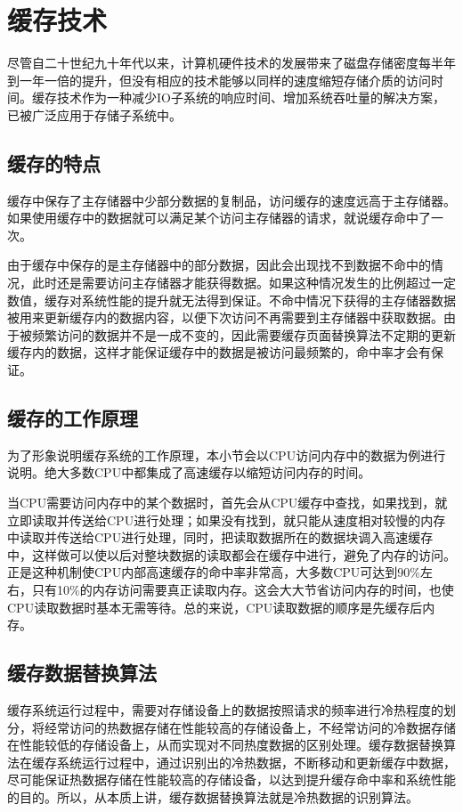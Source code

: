 \section{缓存技术}
\label{sec:cache_tech}

尽管自二十世纪九十年代以来，计算机硬件技术的发展带来了磁盘存储密度每半年到一年一倍的提升，但没有相应的技术能够以同样的速度缩短存储介质的访问时间。缓存技术\cite{cache2011}作为一种减少IO子系统的响应时间、增加系统吞吐量的解决方案，已被广泛应用于存储子系统中。

\subsection{缓存的特点}
缓存中保存了主存储器中少部分数据的复制品，访问缓存的速度远高于主存储器。如果使用缓存中的数据就可以满足某个访问主存储器的请求，就说缓存命中了一次。

由于缓存中保存的是主存储器中的部分数据，因此会出现找不到数据不命中的情况，此时还是需要访问主存储器才能获得数据。如果这种情况发生的比例超过一定数值，缓存对系统性能的提升就无法得到保证。不命中情况下获得的主存储器数据被用来更新缓存内的数据内容，以便下次访问不再需要到主存储器中获取数据。由于被频繁访问的数据并不是一成不变的，因此需要缓存页面替换算法不定期的更新缓存内的数据，这样才能保证缓存中的数据是被访问最频繁的，命中率才会有保证。

\subsection{缓存的工作原理}
为了形象说明缓存系统的工作原理，本小节会以CPU访问内存中的数据为例进行说明。绝大多数CPU中都集成了高速缓存以缩短访问内存的时间。

当CPU需要访问内存中的某个数据时，首先会从CPU缓存中查找，如果找到，就立即读取并传送给CPU进行处理；如果没有找到，就只能从速度相对较慢的内存中读取并传送给CPU进行处理，同时，把读取数据所在的数据块调入高速缓存中，这样做可以使以后对整块数据的读取都会在缓存中进行，避免了内存的访问。正是这种机制使CPU内部高速缓存的命中率非常高，大多数CPU可达到90\%左右，只有10\%的内存访问需要真正读取内存。这会大大节省访问内存的时间，也使CPU读取数据时基本无需等待。总的来说，CPU读取数据的顺序是先缓存后内存。

\subsection{缓存数据替换算法}
缓存系统运行过程中，需要对存储设备上的数据按照请求的频率进行冷热程度的划分，将经常访问的热数据存储在性能较高的存储设备上，不经常访问的冷数据存储在性能较低的存储设备上，从而实现对不同热度数据的区别处理。缓存数据替换算法在缓存系统运行过程中，通过识别出的冷热数据，不断移动和更新缓存中数据，尽可能保证热数据存储在性能较高的存储设备，以达到提升缓存命中率和系统性能的目的。所以，从本质上讲，缓存数据替换算法就是冷热数据的识别算法。

